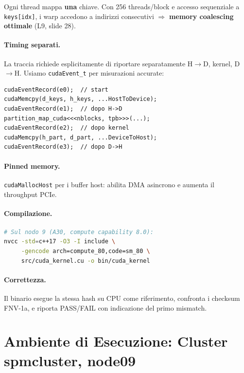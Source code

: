 \documentclass[11pt,a4paper]{article}
\begin{document}
Ogni thread mappa \textbf{una} chiave. Con 256 threads/block e accesso sequenziale a \texttt{keys[idx]}, i warp accedono a indirizzi consecutivi $\Rightarrow$ \textbf{memory coalescing ottimale} (L9, slide 28).

\paragraph{Timing separati.} La traccia richiede esplicitamente di riportare separatamente H$\to$D, kernel, D$\to$H. Usiamo \texttt{cudaEvent\_t} per misurazioni accurate:
\begin{lstlisting}
cudaEventRecord(e0);  // start
cudaMemcpy(d_keys, h_keys, ...HostToDevice);
cudaEventRecord(e1);  // dopo H->D
partition_map_cuda<<<nblocks, tpb>>>(...);
cudaEventRecord(e2);  // dopo kernel
cudaMemcpy(h_part, d_part, ...DeviceToHost);
cudaEventRecord(e3);  // dopo D->H
\end{lstlisting}

\paragraph{Pinned memory.} \texttt{cudaMallocHost} per i buffer host: abilita DMA asincrono e aumenta il throughput PCIe.

\paragraph{Compilazione.}
\begin{lstlisting}[language=bash]
# Sul nodo 9 (A30, compute capability 8.0):
nvcc -std=c++17 -O3 -I include \
     -gencode arch=compute_80,code=sm_80 \
     src/cuda_kernel.cu -o bin/cuda_kernel
\end{lstlisting}

\paragraph{Correttezza.} Il binario esegue la stessa hash su CPU come riferimento, confronta i checksum FNV-1a, e riporta PASS/FAIL con indicazione del primo mismatch.


\section{Ambiente di Esecuzione: Cluster spmcluster, node09}
\label{sec:cluster}
\end{document}
